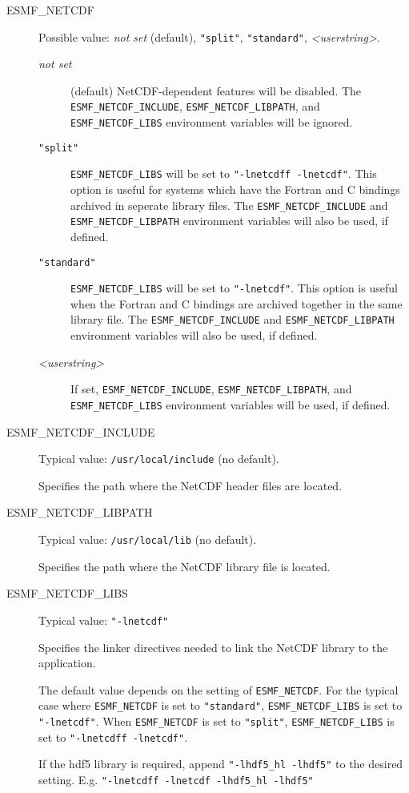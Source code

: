 \begin{description}

\item[ESMF\_NETCDF] Possible value: {\it not set} (default), {\tt "split"}, 
{\tt "standard"}, {\it <userstring>}.

\begin{description}
\item[{\it not set}] (default) NetCDF-dependent features will be disabled.
The {\tt ESMF\_NETCDF\_INCLUDE}, {\tt ESMF\_NETCDF\_LIBPATH}, and
{\tt ESMF\_NETCDF\_LIBS} environment variables will be ignored.

\item[{\tt "split"}] {\tt ESMF\_NETCDF\_LIBS} will be set to 
{\tt "-lnetcdff -lnetcdf"}.  This option is useful for systems 
which have the Fortran and C bindings archived in seperate library files.  
The {\tt ESMF\_NETCDF\_INCLUDE} and {\tt ESMF\_NETCDF\_LIBPATH}
environment variables will also be used, if defined.

\item[{\tt "standard"}] {\tt ESMF\_NETCDF\_LIBS} will be set to 
{\tt "-lnetcdf"}.  This option is useful when the Fortran and 
C bindings are archived together in the same library file.  The {\tt ESMF\_NETCDF\_INCLUDE} 
and {\tt ESMF\_NETCDF\_LIBPATH} environment variables will also be used, 
if defined.

\item[{\it <userstring>}] If set, {\tt ESMF\_NETCDF\_INCLUDE}, 
{\tt ESMF\_NETCDF\_LIBPATH}, and {\tt ESMF\_NETCDF\_LIBS} environment 
variables will be used, if defined.
\end{description}

\item[ESMF\_NETCDF\_INCLUDE] Typical value: {\tt /usr/local/include} 
(no default).

Specifies the path where the NetCDF header files are located.

\item[ESMF\_NETCDF\_LIBPATH] Typical value: {\tt /usr/local/lib} (no default).

Specifies the path where the NetCDF library file is located.

\item[ESMF\_NETCDF\_LIBS] Typical value: {\tt "-lnetcdf"} 

Specifies the linker directives needed to link the NetCDF library to
the application.

The default value depends on the setting of {\tt ESMF\_NETCDF}.  For the 
typical case where {\tt ESMF\_NETCDF} is set to {\tt "standard"}, 
{\tt ESMF\_NETCDF\_LIBS} is set to {\tt "-lnetcdf"}.  
When {\tt ESMF\_NETCDF} is set to {\tt "split"}, {\tt ESMF\_NETCDF\_LIBS} 
is set to {\tt "-lnetcdff -lnetcdf"}.

If the hdf5 library is required, append {\tt "-lhdf5\_hl -lhdf5"} to the
desired setting.  E.g. {\tt "-lnetcdff -lnetcdf -lhdf5\_hl -lhdf5"}
\end{description}

